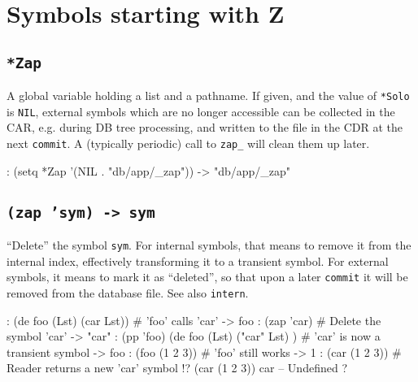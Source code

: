 %
%
%



\chapter{Symbols starting with Z}
\label{cha:func-ref-Z-functions-starting-with-Z}

 
\section*{\texttt{*Zap}}
\label{sec:func-ref-Z-*Zap}


A global variable holding a list and a pathname. If given, and the value
of \texttt{*Solo} is \texttt{NIL}, external symbols which are no longer accessible can
be collected in the CAR, e.g. during DB tree processing, and written to
the file in the CDR at the next \texttt{commit}. A (typically periodic) call to
\texttt{zap\_} will clean them up later.


\begin{wideverbatim}
: (setq *Zap '(NIL . "db/app/_zap"))
-> "db/app/_zap"
\end{wideverbatim}

 
\section*{\texttt{(zap 'sym) -> sym}}
\label{sec:func-ref-Z-(zap 'sym) -> sym}


``Delete'' the symbol \texttt{sym}. For internal symbols, that means to remove it
from the internal index, effectively transforming it to a transient
symbol. For external symbols, it means to mark it as ``deleted'', so that
upon a later \texttt{commit} it will be removed from the database file. See
also \texttt{intern}.


\begin{wideverbatim}
: (de foo (Lst) (car Lst))          # 'foo' calls 'car'
-> foo
: (zap 'car)                        # Delete the symbol 'car'
-> "car"
: (pp 'foo)
(de foo (Lst)
   ("car" Lst) )                    # 'car' is now a transient symbol
-> foo
: (foo (1 2 3))                     # 'foo' still works
-> 1
: (car (1 2 3))                     # Reader returns a new 'car' symbol
!? (car (1 2 3))
car -- Undefined
?
\end{wideverbatim}

